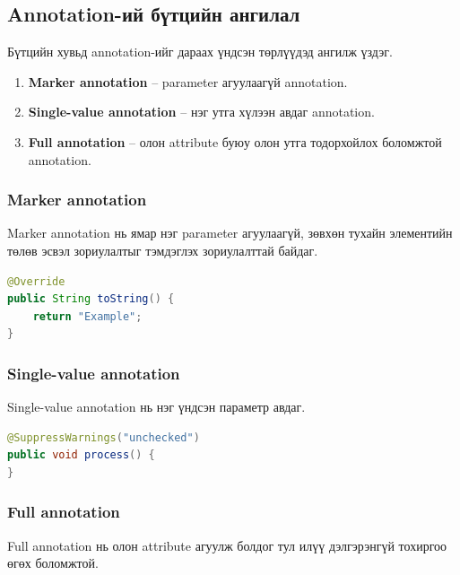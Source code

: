 \subsection{Annotation-ий бүтцийн ангилал}

Бүтцийн хувьд annotation-ийг дараах үндсэн төрлүүдэд ангилж үздэг.

\begin{enumerate}
    \item \textbf{Marker annotation} -- parameter агуулаагүй annotation.
    \item \textbf{Single-value annotation} -- нэг утга хүлээн авдаг annotation.
    \item \textbf{Full annotation} -- олон attribute буюу олон утга тодорхойлох боломжтой annotation.
\end{enumerate}

\newpage
\subsubsection{Marker annotation}

Marker annotation нь ямар нэг parameter агуулаагүй, зөвхөн тухайн элементийн төлөв эсвэл зориулалтыг тэмдэглэх зориулалттай байдаг.

\begin{lstlisting}[language=Java, caption={Marker annotation жишээ}, label={lst:marker-annotation}]
@Override
public String toString() {
    return "Example";
}
\end{lstlisting}

\subsubsection{Single-value annotation}

Single-value annotation нь нэг үндсэн параметр авдаг.

\begin{lstlisting}[language=Java, caption={Single-value annotation жишээ}, label={lst:single-value-annotation}]
@SuppressWarnings("unchecked")
public void process() {
}
\end{lstlisting}

\subsubsection{Full annotation}

Full annotation нь олон attribute агуулж болдог тул илүү дэлгэрэнгүй тохиргоо өгөх боломжтой.

